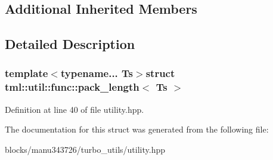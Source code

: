 \subsection*{Additional Inherited Members}


\subsection{Detailed Description}
\subsubsection*{template$<$typename... Ts$>$struct tml\+::util\+::func\+::pack\+\_\+length$<$ Ts $>$}



Definition at line 40 of file utility.\+hpp.



The documentation for this struct was generated from the following file\+:\begin{DoxyCompactItemize}
\item 
blocks/manu343726/turbo\+\_\+utils/utility.\+hpp\end{DoxyCompactItemize}
